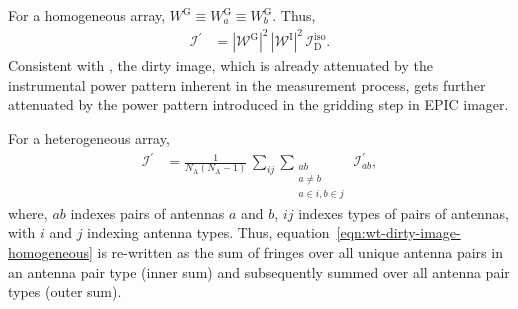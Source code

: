 \documentclass[a4paper,fleqn,usenatbib]{mnras}
\newcommand{\Nant}{N_\textrm{A}}
\begin{document}
For a homogeneous array, $W^\textrm{G} \equiv W^\textrm{G}_a \equiv W^\textrm{G}_b$. Thus,  
\begin{align}\label{eqn:wt-dirty-image-homogeneous}
  \mathcal{I}^\prime &= \left|\mathcal{W}^\textrm{G}\right|^2\,\left|\mathcal{W}^\textrm{I}\right|^2\,\mathcal{I}_\textrm{D}^\textrm{iso}.
\end{align}
Consistent with \citet{mor09}, the dirty image, which is already attenuated by the instrumental power pattern inherent in the measurement process, gets further attenuated by the power pattern introduced in the gridding step in EPIC imager.

For a heterogeneous array, 
\begin{align}\label{eqn:wt-dirty-image-EPIC-decomp}
  \mathcal{I}^\prime &= \frac{1}{\Nant(\Nant-1)}\,\sum_{ij}\sum_{\substack{ab\\a\ne b\\a\in i, b\in j}}\,\mathcal{I}^\prime_{ab},
\end{align}
where, $ab$ indexes pairs of antennas $a$ and $b$, $ij$ indexes types of pairs of antennas, with $i$ and $j$ indexing antenna types. Thus, equation~\ref{eqn:wt-dirty-image-homogeneous} is re-written as the sum of fringes over all unique antenna pairs in an antenna pair type (inner sum) and subsequently summed over all antenna pair types (outer sum). 
\end{document}

